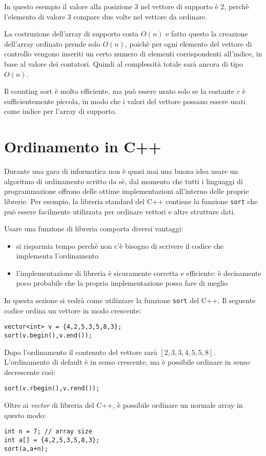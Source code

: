 In questo esempio il valore alla posizione 3
nel vettore di supporto è 2,
perchè l'elemento di valore 3 compare due volte
nel vettore da ordinare.

La costruzione dell'array di supporto costa
$O(n)$ e fatto questo la creazione dell'array ordinato
prende solo $O(n)$, poichè per ogni elemento del vettore
di controllo vengono inseriti un certo numero di elementi 
corrispondenti all'indice, in base al valore dei contatori.
Quindi al complessità totale sarà ancora di tipo $O(n)$.

Il counting sort è molto efficiente, ma può essere usato
solo se la costante $c$ è sufficientemente piccola, in modo 
che i valori del vettore possano essere usati come indice
per l'array di supporto.

\section{Ordinamento in C++}


Durante una gara di informatica 
non è quasi mai una buona idea usare un 
algoritmo di ordinamento scritto da sè,
dal momento che tutti i linguaggi di programmazione
offrono delle ottime implementazioni
all'interno delle proprie librerie.
Per esempio, la libreria standard del C++
contiene la funzione \texttt{sort}
che può essere facilmente utilizzata
per ordinare vettori e altre strutture dati.

Usare una funzione di libreria comporta diversi vantaggi:
\begin{itemize}
\item si risparmia tempo perchè non c'è bisogno di scrivere
il codice che implementa l'ordinamento
\item l'implementazione di libreria è sicuramente
corretta e efficiente: è decisamente poco probabile
che la propria implementazione possa fare di meglio
\end{itemize}

In questa sezione si vedrà come utilizzare la
funzione \texttt{sort} del C++.
Il seguente codice ordina un vettore
in modo crescente:
\begin{lstlisting}
vector<int> v = {4,2,5,3,5,8,3};
sort(v.begin(),v.end());
\end{lstlisting}
Dopo l'ordinamento il contenuto del vettore sarà
$[2,3,3,4,5,5,8]$.
L'ordinamento di default è in senso crescente,
ma è possibile ordinare in senso decrescente così:
\begin{lstlisting}
sort(v.rbegin(),v.rend());
\end{lstlisting}
Oltre ai \emph{vector} di libreria del C++,
è possibile ordinare un normale array in questo modo:
\begin{lstlisting}
int n = 7; // array size
int a[] = {4,2,5,3,5,8,3};
sort(a,a+n);
\end{lstlisting}

